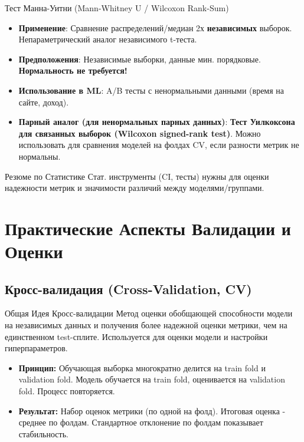 \begin{myexampleblock}{{Тест Манна-Уитни (Mann-Whitney U / Wilcoxon Rank-Sum)}}
    \begin{itemize}[nosep, leftmargin=*]
        \item \textbf{Применение}: Сравнение распределений/медиан 2х \textbf{независимых} выборок. Непараметрический аналог независимого t-теста.
        \item \textbf{Предположения}: Независимые выборки, данные мин. порядковые. \textbf{Нормальность не требуется!}
        \item \textbf{Использование в ML}: A/B тесты с ненормальными данными (время на сайте, доход).
        \item \textbf{Парный аналог (для ненормальных парных данных)}: \textbf{Тест Уилкоксона для связанных выборок (Wilcoxon signed-rank test)}. Можно использовать для сравнения моделей на фолдах CV, если разности метрик не нормальны.
    \end{itemize}
\end{myexampleblock}

\begin{myblock}{Резюме по Статистике}
Стат. инструменты (CI, тесты) нужны для оценки надежности метрик и значимости различий между моделями/группами.
\end{myblock}

\section{Практические Аспекты Валидации и Оценки}

\subsection{Кросс-валидация (Cross-Validation, CV)}

\begin{myblock}{Общая Идея Кросс-валидации}
Метод оценки обобщающей способности модели на независимых данных и получения более надежной оценки метрики, чем на единственном test-сплите. Используется для оценки модели и настройки гиперпараметров.
\begin{itemize}[nosep, leftmargin=*]
    \item \textbf{Принцип:} Обучающая выборка многократно делится на train fold и validation fold. Модель обучается на train fold, оценивается на validation fold. Процесс повторяется.
    \item \textbf{Результат:} Набор оценок метрики (по одной на фолд). Итоговая оценка - среднее по фолдам. Стандартное отклонение по фолдам показывает стабильность.
\end{itemize}
\end{myblock}

